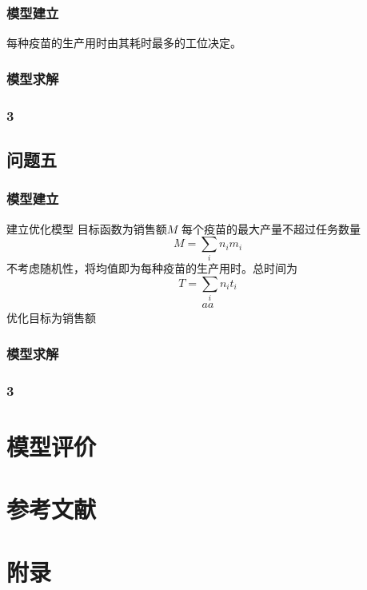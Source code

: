 \documentclass[UTF8]{ctexart}
\begin{document}
	\subsubsection{模型建立}
	每种疫苗的生产用时由其耗时最多的工位决定。
	\subsubsection{模型求解}
	\subsubsection{3}
	
	\subsection{问题五}
	\subsubsection{模型建立}
	建立优化模型
	目标函数为销售额$M$
	每个疫苗的最大产量不超过任务数量
	\begin{equation}
		M=\sum_{i}n_{i}m_{i}
	\end{equation}
	不考虑随机性，将均值即为每种疫苗的生产用时。总时间为
	\begin{equation}
		T=\sum_{i}n_{i}t_{i}
	\end{equation}
	\begin{equation}
	\begin{split}
		aa
	\end{split}
	\end{equation}
	优化目标为销售额
	\subsubsection{模型求解}
	\subsubsection{3}
	
	\section{模型评价}
	
	
	\section{参考文献}
	
	\section{附录}
	\begin{appendices}
		
	\end{appendices}
	
\end{document}
